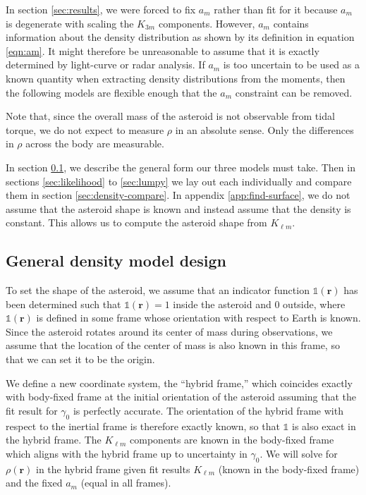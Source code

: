 \documentclass[fleqn,usenatbib]{mnras}
\begin{document}
In section \ref{sec:results}, we were forced to fix $a_m$ rather than fit for it because $a_m$ is degenerate with scaling the $K_{3m}$ components. However, $a_m$ contains information about the density distribution as shown by its definition in equation \ref{eqn:am}. It might therefore be unreasonable to assume that it is exactly determined by light-curve or radar analysis. If $a_m$ is too uncertain to be used as a known quantity when extracting density distributions from the moments, then the following models are flexible enough that the $a_m$ constraint can be removed.

Note that, since the overall mass of the asteroid is not observable from tidal torque, we do not expect to measure $\rho$ in an absolute sense. Only the differences in $\rho$ across the body are measurable.

In section \ref{sec:general-density}, we describe the general form our three models must take. Then in sections \ref{sec:likelihood} to \ref{sec:lumpy} we lay out each individually and compare them in section \ref{sec:density-compare}. In appendix \ref{app:find-surface}, we do not assume that the asteroid shape is known and instead assume that the density is constant. This allows us to compute the asteroid shape from $K_{\ell m}$.


\subsection{General density model design}
\label{sec:general-density}

To set the shape of the asteroid, we assume that an indicator function $\mathds{1}(\bm r)$ has been determined such that $\mathds{1}(\bm r) = 1$ inside the asteroid and 0 outside, where $\mathds{1}(\bm r)$ is defined in some frame whose orientation with respect to Earth is known. Since the asteroid rotates around its center of mass during observations, we assume that the location of the center of mass is also known in this frame, so that we can set it to be the origin.

We define a new coordinate system, the ``hybrid frame,'' which coincides exactly with body-fixed frame at the initial orientation of the asteroid assuming that the fit result for $\gamma_0$ is perfectly accurate. The orientation of the hybrid frame with respect to the inertial frame is therefore exactly known, so that $\mathds{1}$ is also exact in the hybrid frame. The $K_{\ell m}$ components are known in the body-fixed frame which aligns with the hybrid frame up to uncertainty in $\gamma_0$. We will solve for $\rho(\bm r)$ in the hybrid frame given fit results $K_{\ell m}$ (known in the body-fixed frame) and the fixed $a_m$ (equal in all frames).
\end{document}
